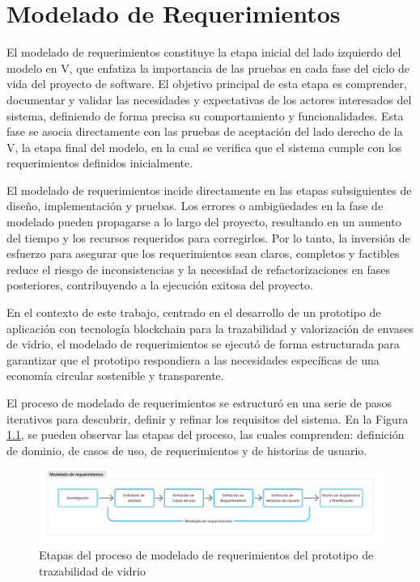 \chapter[Modelado de Requerimientos]{Modelado de Requerimientos}
\label{cp:modelling}

\parindent0pt

El modelado de requerimientos constituye la etapa inicial del lado izquierdo del modelo en V, que enfatiza la importancia de las pruebas en cada fase del ciclo de vida del proyecto de software. El objetivo principal de esta etapa es comprender, documentar y validar las necesidades y expectativas de los actores interesados del sistema, definiendo de forma precisa su comportamiento y funcionalidades. Esta fase se asocia directamente con las pruebas de aceptación del lado derecho de la V, la etapa final del modelo, en la cual se verifica que el sistema cumple con los requerimientos definidos inicialmente.

El modelado de requerimientos incide directamente en las etapas subsiguientes de diseño, implementación y pruebas. Los errores o ambigüedades en la fase de modelado pueden propagarse a lo largo del proyecto, resultando en un aumento del tiempo y los recursos requeridos para corregirlos. Por lo tanto, la inversión de esfuerzo para asegurar que los requerimientos sean claros, completos y factibles reduce el riesgo de inconsistencias y la necesidad de refactorizaciones en fases posteriores, contribuyendo a la ejecución exitosa del proyecto.

En el contexto de este trabajo, centrado en el desarrollo de un prototipo de aplicación con tecnología blockchain para la trazabilidad y valorización de envases de vidrio, el modelado de requerimientos se ejecutó de forma estructurada para garantizar que el prototipo respondiera a las necesidades específicas de una economía circular sostenible y transparente.

El proceso de modelado de requerimientos se estructuró en una serie de pasos iterativos para descubrir, definir y refinar los requisitos del sistema. En la Figura \ref{fig:requirements-modelling-process}, se pueden observar las etapas del proceso, las cuales comprenden: definición de dominio, de casos de uso, de requerimientos y de historias de usuario.

\begin{figure}[!htpb]
    \centering
    \includegraphics[width=\linewidth]{Figures/requirements-modelling.png}
    \caption{Etapas del proceso de modelado de requerimientos del prototipo de trazabilidad de vidrio}
    \label{fig:requirements-modelling-process}
\end{figure}


